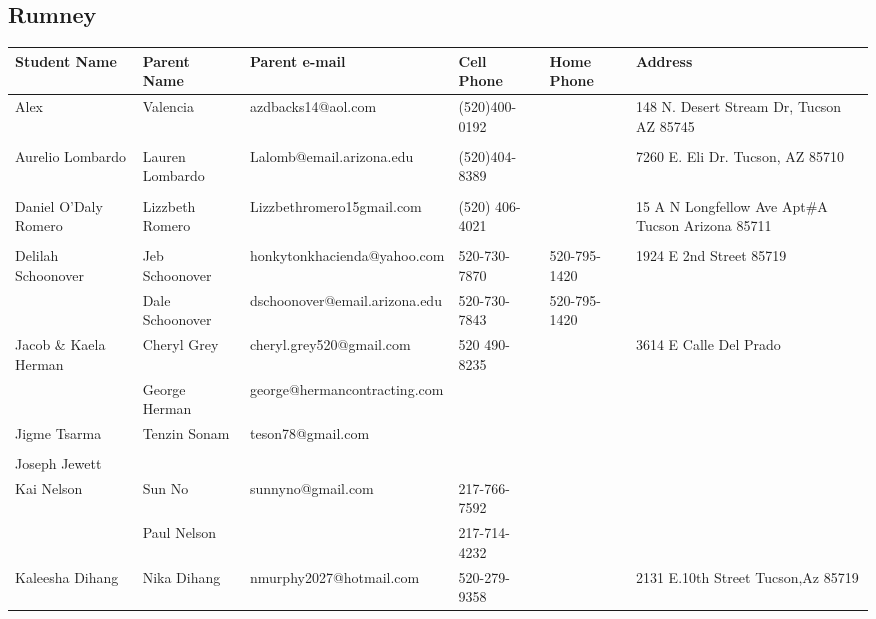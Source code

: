 \documentclass[landscape]{article}\usepackage[]{graphicx}\usepackage[]{color}
\begin{document}
\subsection{Rumney}
\begin{longtable}{|p{100pt}|p{100pt}|p{140pt}|p{60pt}|p{64pt}|p{120pt}|}
\textbf{Student Name} & \textbf{Parent Name} & \textbf{Parent e-mail} & \textbf{Cell Phone} & \textbf{Home Phone} & \textbf{Address}\\
\hline
\hline
\multirow{2}{100pt}{Alex} & Valencia & azdbacks14@aol.com & (520)400-0192 &  & \multirow{2}{120pt}{148 N. Desert Stream Dr, Tucson AZ 85745} \\
 &  &  &  &  & \\
\hline
\multirow{2}{100pt}{Aurelio Lombardo} & Lauren Lombardo & Lalomb@email.arizona.edu & (520)404-8389 &  & \multirow{2}{120pt}{7260 E. Eli Dr. Tucson, AZ 85710} \\
 &  &  &  &  & \\
\hline
\multirow{2}{100pt}{Daniel O'Daly Romero} & Lizzbeth Romero & Lizzbethromero15gmail.com & (520) 406-4021   &  & \multirow{2}{120pt}{15 A N Longfellow Ave Apt\#A Tucson Arizona 85711} \\
 &  &  &  &  & \\
\hline
\multirow{2}{100pt}{Delilah Schoonover} & Jeb Schoonover & honkytonkhacienda@yahoo.com & 520-730-7870 & 520-795-1420 & \multirow{2}{120pt}{1924 E 2nd Street 85719} \\
 & Dale Schoonover & dschoonover@email.arizona.edu & 520-730-7843 & 520-795-1420 & \\
\hline
\multirow{2}{100pt}{Jacob \& Kaela Herman} & Cheryl Grey & cheryl.grey520@gmail.com & 520 490-8235 &  & \multirow{2}{120pt}{3614 E Calle Del Prado} \\
 & George Herman & george@hermancontracting.com &  &  & \\
\hline
\multirow{2}{100pt}{Jigme Tsarma} & Tenzin Sonam & teson78@gmail.com &  &  & \multirow{2}{120pt}{} \\
 &  &  &  &  & \\
\hline
\multirow{2}{100pt}{Joseph Jewett} &  &  &  &  & \multirow{2}{120pt}{} \\
 &  &  &  &  & \\
\hline
\multirow{2}{100pt}{Kai Nelson} & Sun No & sunnyno@gmail.com & 217-766-7592 &  & \multirow{2}{120pt}{} \\
 & Paul Nelson &  & 217-714-4232 &  & \\
\hline
\multirow{2}{100pt}{Kaleesha Dihang} & Nika Dihang & nmurphy2027@hotmail.com & 520-279-9358 &  & \multirow{2}{120pt}{2131 E.10th Street Tucson,Az 85719} \\

\end{longtable}
\end{document}
